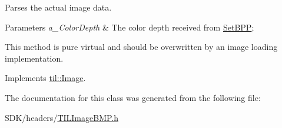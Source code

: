 Parses the actual image data. 


\begin{DoxyParams}{Parameters}
{\em a\_\-ColorDepth} & The color depth received from \hyperlink{classtil_1_1_image_ae1202f84c0addb81eba161f746a9d4cc}{SetBPP};\\
\hline
\end{DoxyParams}
This method is pure virtual and should be overwritten by an image loading implementation. 

Implements \hyperlink{classtil_1_1_image_a2436c982f6b403ab07591f06107fe432}{til::Image}.



The documentation for this class was generated from the following file:\begin{DoxyCompactItemize}
\item 
SDK/headers/\hyperlink{_t_i_l_image_b_m_p_8h}{TILImageBMP.h}\end{DoxyCompactItemize}
